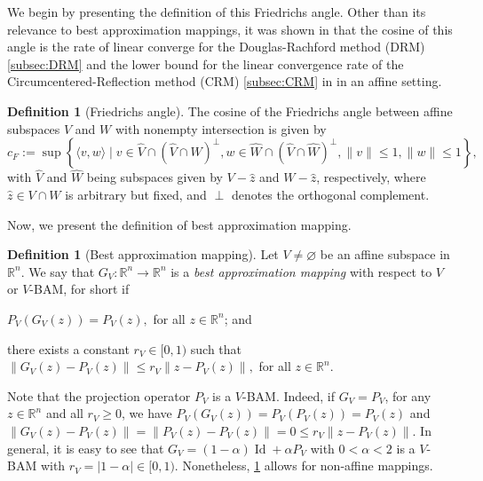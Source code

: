 \documentclass[smallextended,numbook,nospthms]{svjour3}
\theoremstyle{plain}
\theoremstyle{definition}
\newtheorem{definition}[theorem]{Definition}
\def\RR{\mathds R}
\DeclareMathOperator{\Id}{Id}
\begin{document}
We begin by presenting the definition of this Friedrichs angle. Other than its relevance to best approximation mappings, it was shown in \cite{BCNPW14} that the cosine of this angle is the rate of linear converge for the Douglas-Rachford method (DRM) \cref{subsec:DRM} and the lower bound for the linear convergence rate of the Circumcentered-Reflection method (CRM) \cref{subsec:CRM} in \cite{Behling:2018} in an affine setting.
\begin{definition}[Friedrichs angle]\label{def:Friedrich}
	The cosine of the Friedrichs angle between affine subspaces $V$ and $W$ with nonempty intersection is given by
	$$
	c_{F}:=\sup \left\{\langle v, w\rangle \mid v \in \hat{V} \cap(\hat{V} \cap \hat{W})^{\perp}, w \in \hat{W} \cap(\hat{V} \cap \hat{W})^{\perp},\|v\| \leq 1,\|w\| \leq 1\right\},
	$$
	with $\hat{V}$ and $\hat{W}$ being subspaces given by $V-\hat{z}$ and $W-\hat{z}$, respectively, where $\hat{z} \in V \cap W$ is arbitrary but fixed, and $\perp$ denotes the orthogonal complement.
\end{definition}

Now, we present the definition of best approximation mapping.
\begin{definition}[Best approximation mapping]\label{def:BAM}
Let $V \neq \varnothing$ be an affine subspace in $\RR^{n}$. We say that $G_{V}: \RR^{n} \rightarrow \RR^{n}$ is a \emph{best approximation mapping} with respect to $V$ or $V$-BAM, for short if
\begin{listi}
	\item $P_{V}\left(G_{V}(z)\right)=P_{V}(z),$ for all $z \in \RR^{n}$; and
	\item there exists a constant $r_{V} \in[0,1)$ such that $\left\|G_{V}(z)-P_{V}(z)\right\| \leq r_{V}\left\|z-P_{V}(z)\right\|,$ for all $z \in \RR^{n}$.
\end{listi}
\end{definition}

Note that the projection operator $P_{V}$ is a $V$-BAM. Indeed, if $G_{V}=P_{V}$, for any $z \in \RR^{n}$ and all $r_{V} \geq 0$, we have $P_{V}\left(G_{V}(z)\right)=P_{V}\left(P_{V}(z)\right)=P_{V}(z)$ and $\left\|G_{V}(z)-P_{V}(z)\right\|=\left\|P_{V}(z)-P_{V}(z)\right\|=0 \leq r_{V}\left\|z-P_{V}(z)\right\|$. 
In general, it is easy to see that $G_{V} = (1-\alpha) \Id + \alpha P_{V}$ with $0<\alpha<2$ is a $V$-BAM with $r_{V}=|1-\alpha| \in[0,1)$. Nonetheless, \cref{def:BAM} allows for non-affine mappings.
\end{document}
